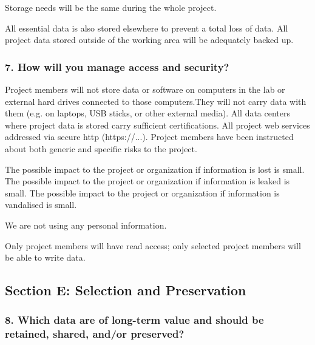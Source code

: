 \documentclass[
]{article}
\begin{document}
Storage needs will be the same during the whole project.

All essential data is also stored elsewhere to prevent a total loss of
data. All project data stored outside of the working area will be
adequately backed up.

\hypertarget{q-access-security}{}
\hypertarget{how-will-you-manage-access-and-security}{%
\subsubsection{7. How will you manage access and
security?}\label{how-will-you-manage-access-and-security}}

Project members will not store data or software on computers in the lab
or external hard drives connected to those computers.They will not carry
data with them (e.g. on laptops, USB sticks, or other external media).
All data centers where project data is stored carry sufficient
certifications. All project web services addressed via secure http
(https://...). Project members have been instructed about both generic
and specific risks to the project.

The possible impact to the project or organization if information is
lost is small. The possible impact to the project or organization if
information is leaked is small. The possible impact to the project or
organization if information is vandalised is small.

We are not using any personal information.

Only project members will have read access; only selected project
members will be able to write data.

\hypertarget{sec-selection-preservation}{}
\hypertarget{section-e-selection-and-preservation}{%
\subsection{Section E: Selection and
Preservation}\label{section-e-selection-and-preservation}}

\hypertarget{q-which-longterm}{}
\hypertarget{which-data-are-of-long-term-value-and-should-be-retained-shared-andor-preserved}{%
\subsubsection{8. Which data are of long-term value and should be
retained, shared, and/or
preserved?}\label{which-data-are-of-long-term-value-and-should-be-retained-shared-andor-preserved}}
\end{document}
